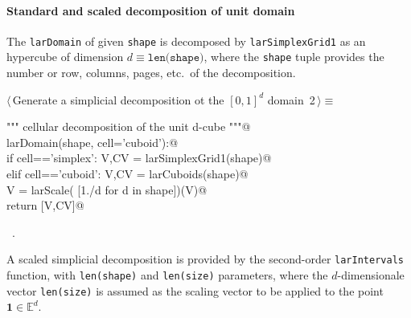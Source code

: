 \documentclass[11pt,oneside]{article}	%
\def\E{\mathbb{E}}
\begin{document}
\paragraph{Standard and scaled decomposition of unit domain}
The \texttt{larDomain} of given \texttt{shape} is decomposed by \texttt{larSimplexGrid1} as an hypercube of dimension $d \equiv\texttt{len(shape)}$, where the \texttt{shape} tuple provides the number or row, columns, pages, etc.~of the decomposition.

\begin{flushleft} \small \label{scrap1}
\protect{}$\langle\,$Generate a simplicial decomposition ot the $[0,1]^d$ domain\nobreak\ {\footnotesize 2}$\,\rangle\equiv$
\vspace{-1ex}
\begin{list}{}{} \item
\mbox{}\verb@""" cellular decomposition of the unit d-cube """@\\
\mbox{}\verb@def larDomain(shape, cell='cuboid'):@\\
\mbox{}\verb@   if cell=='simplex': V,CV = larSimplexGrid1(shape)@\\
\mbox{}\verb@   elif cell=='cuboid': V,CV = larCuboids(shape)@\\
\mbox{}\verb@   V = larScale( [1./d for d in shape])(V)@\\
\mbox{}\verb@   return [V,CV]@\\
\mbox{}\verb@@{\NWsep}
\end{list}
\vspace{-1ex}
\footnotesize\addtolength{\baselineskip}{-1ex}
\begin{list}{}{\setlength{\itemsep}{-\parsep}\setlength{\itemindent}{-\leftmargin}}
\item \NWtxtMacroRefIn\ .
\end{list}
\end{flushleft}

A scaled simplicial decomposition is provided by the second-order  \texttt{larIntervals} function, with \texttt{len(shape)} and \texttt{len(size)} parameters, where the $d$-dimensionale vector \texttt{len(size)} is assumed as the scaling vector to be applied to the point $\mathbf{1}\in\E^d$.
\end{document}
